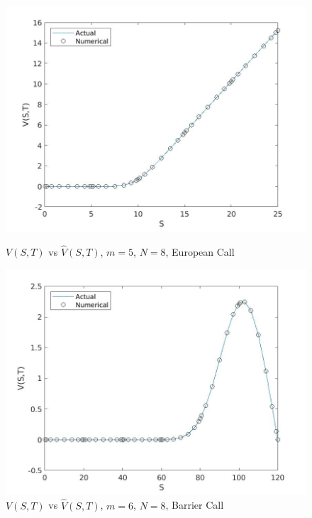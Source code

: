 \documentclass[a4paper,12pt]{article}
\begin{document}
\begin{figure}[p]
        \centering
        \includegraphics[width = \linewidth]{eur_vs (1).jpg}
        \caption{$V(S,T)$ vs $\hat{V}(S,T)$, $m=5$, $N=8$, European Call}
        \includegraphics[width = \linewidth]{b_vs.jpg}
        \caption{$V(S,T)$ vs $\hat{V}(S,T)$, $m=6$, $N=8$, Barrier Call}
\end{figure}
\end{document}
